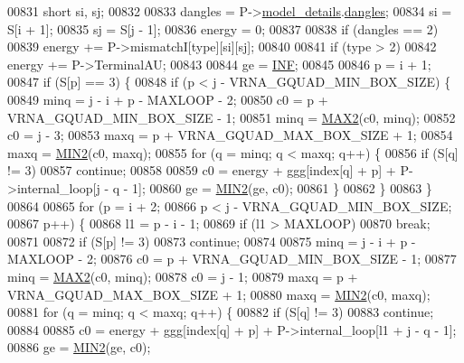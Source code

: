 \begin{DoxyCode}
00831   \textcolor{keywordtype}{short} si, sj;
00832 
00833   dangles = P->\hyperlink{group__energy__parameters_a7b84353eb9075c595bad4ceb871bcae7}{model\_details}.\hyperlink{group__model__details_adcda4ff2ea77748ae0e8700288282efc}{dangles};
00834   si      = S[i + 1];
00835   sj      = S[j - 1];
00836   energy  = 0;
00837 
00838   \textcolor{keywordflow}{if} (dangles == 2)
00839     energy += P->mismatchI[type][si][sj];
00840 
00841   \textcolor{keywordflow}{if} (type > 2)
00842     energy += P->TerminalAU;
00843 
00844   ge = \hyperlink{energy__const_8h_a12c2040f25d8e3a7b9e1c2024c618cb6}{INF};
00845 
00846   p = i + 1;
00847   \textcolor{keywordflow}{if} (S[p] == 3) \{
00848     \textcolor{keywordflow}{if} (p < j - VRNA\_GQUAD\_MIN\_BOX\_SIZE) \{
00849       minq  = j - i + p - MAXLOOP - 2;
00850       c0    = p + VRNA\_GQUAD\_MIN\_BOX\_SIZE - 1;
00851       minq  = \hyperlink{group__utils_ga33297b3679c713b0c4d897cd0fe3b122}{MAX2}(c0, minq);
00852       c0    = j - 3;
00853       maxq  = p + VRNA\_GQUAD\_MAX\_BOX\_SIZE + 1;
00854       maxq  = \hyperlink{group__utils_gae0b9cd0ce090bd69b951aa73e8fa4f7d}{MIN2}(c0, maxq);
00855       \textcolor{keywordflow}{for} (q = minq; q < maxq; q++) \{
00856         \textcolor{keywordflow}{if} (S[q] != 3)
00857           \textcolor{keywordflow}{continue};
00858 
00859         c0  = energy + ggg[index[q] + p] + P->internal\_loop[j - q - 1];
00860         ge  = \hyperlink{group__utils_gae0b9cd0ce090bd69b951aa73e8fa4f7d}{MIN2}(ge, c0);
00861       \}
00862     \}
00863   \}
00864 
00865   \textcolor{keywordflow}{for} (p = i + 2;
00866        p < j - VRNA\_GQUAD\_MIN\_BOX\_SIZE;
00867        p++) \{
00868     l1 = p - i - 1;
00869     \textcolor{keywordflow}{if} (l1 > MAXLOOP)
00870       \textcolor{keywordflow}{break};
00871 
00872     \textcolor{keywordflow}{if} (S[p] != 3)
00873       \textcolor{keywordflow}{continue};
00874 
00875     minq  = j - i + p - MAXLOOP - 2;
00876     c0    = p + VRNA\_GQUAD\_MIN\_BOX\_SIZE - 1;
00877     minq  = \hyperlink{group__utils_ga33297b3679c713b0c4d897cd0fe3b122}{MAX2}(c0, minq);
00878     c0    = j - 1;
00879     maxq  = p + VRNA\_GQUAD\_MAX\_BOX\_SIZE + 1;
00880     maxq  = \hyperlink{group__utils_gae0b9cd0ce090bd69b951aa73e8fa4f7d}{MIN2}(c0, maxq);
00881     \textcolor{keywordflow}{for} (q = minq; q < maxq; q++) \{
00882       \textcolor{keywordflow}{if} (S[q] != 3)
00883         \textcolor{keywordflow}{continue};
00884 
00885       c0  = energy + ggg[index[q] + p] + P->internal\_loop[l1 + j - q - 1];
00886       ge  = \hyperlink{group__utils_gae0b9cd0ce090bd69b951aa73e8fa4f7d}{MIN2}(ge, c0);

\end{DoxyCode}
